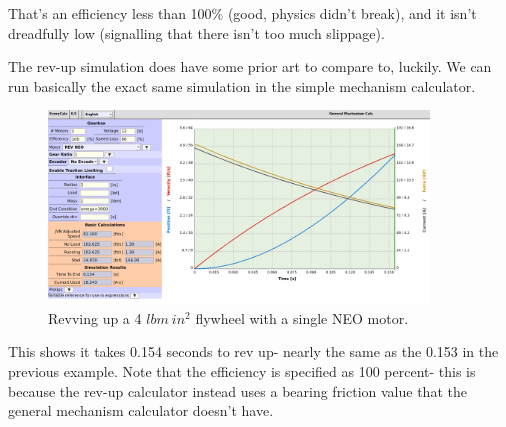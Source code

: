 \documentclass[10pt,letterpaper]{article}
\begin{document}
	That's an efficiency less than 100\% (good, physics didn't break), and it isn't dreadfully low (signalling that there isn't too much slippage).

	The rev-up simulation does have some prior art to compare to, luckily. We can run basically the exact same simulation in the simple mechanism calculator.

	\begin{figure}[H]
		\includegraphics[width=0.9\textwidth]{validation/hood_ECrev_A.png}
		\caption{Revving up a 4 $lbm\ in^2$ flywheel with a single NEO motor.}
	\end{figure}

	This shows it takes 0.154 seconds to rev up- nearly the same as the 0.153 in the previous example. Note that the efficiency is specified as 100 percent- this is because the rev-up calculator instead uses a bearing friction value that the general mechanism calculator doesn't have.
\end{document}

